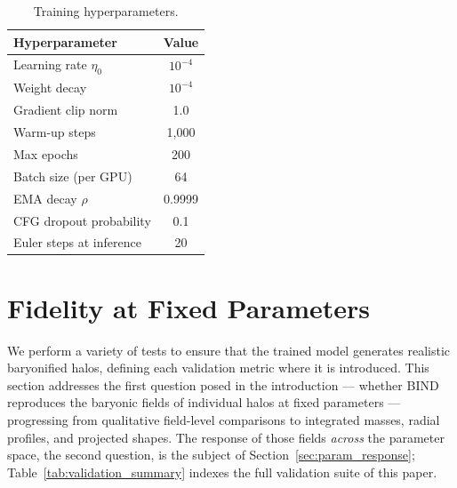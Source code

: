 \documentclass[linenumbers,trackchanges, twocolumn]{aastex701}
\begin{document}
\begin{table}
\centering
\caption{Training hyperparameters.}
\label{tab:training}
\begin{tabular}{lc}
\hline
Hyperparameter & Value \\
\hline
Learning rate $\eta_0$      & $10^{-4}$ \\
Weight decay                & $10^{-4}$ \\
Gradient clip norm          & 1.0 \\
Warm-up steps               & 1{,}000 \\
Max epochs                  & 200 \\
Batch size (per GPU)        & 64 \\
EMA decay $\rho$            & 0.9999 \\
CFG dropout probability     & 0.1 \\
Euler steps at inference    & 20 \\
\hline
\end{tabular}
\end{table}

\section{Fidelity at Fixed Parameters}\label{sec:validation}
We perform a variety of tests to ensure that the trained model generates realistic baryonified halos, defining each validation metric where it is introduced.
This section addresses the first question posed in the introduction --- whether \textsc{BIND} reproduces the baryonic fields of individual halos at fixed parameters --- progressing from qualitative field-level comparisons to integrated masses, radial profiles, and projected shapes. The response of those fields \emph{across} the parameter space, the second question, is the subject of Section~\ref{sec:param_response}; Table~\ref{tab:validation_summary} indexes the full validation suite of this paper.
\end{document}
